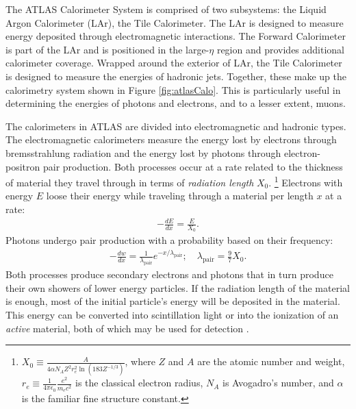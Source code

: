 The ATLAS Calorimeter System is comprised of two subsystems: the Liquid Argon Calorimeter (LAr), the Tile Calorimeter.
The LAr is designed to measure energy deposited through electromagnetic interactions.
The Forward Calorimeter is part of the LAr and is positioned in the large-$\eta$ region and provides additional calorimeter coverage.
Wrapped around the exterior of LAr, the Tile Calorimeter is designed to measure the energies of hadronic jets.
Together, these make up the calorimetry system shown in Figure \ref{fig:atlasCalo}.
This is particularly useful in determining the energies of photons and electrons, and to a lesser extent, muons.

The calorimeters in ATLAS are divided into electromagnetic and hadronic types.
The electromagnetic calorimeters measure the energy lost by electrons through bremsstrahlung radiation and the energy lost by photons through electron-positron pair production.
Both processes occur at a rate related to the thickness of material they travel through in terms of \emph{radiation length} $X_0$.
\footnote{$X_0\equiv\frac{A}{4\alpha N_AZ^2r_e^2\ln(183Z^{-1/3})}$, where $Z$ and $A$ are the atomic number and weight, $r_e\equiv\frac{1}{4\pi\epsilon_0}\frac{e^2}{m_ec^2}$ is the classical electron radius, $N_A$ is Avogadro's number, and $\alpha$ is the familiar fine structure constant.}
Electrons with energy $E$ loose their energy while traveling through a material per length $x$ at a rate:
\begin{equation}\begin{split}
    -\frac{dE}{dx}=\frac{E}{X_0}.
\end{split}\end{equation}
Photons undergo pair production with a probability based on their frequency:
\begin{equation}\begin{split}
    -\frac{dw}{dx}=\frac{1}{\lambda_\text{pair}}e^{-x/\lambda_\text{pair}}; \quad \lambda_\text{pair}=\frac{9}{7}X_0.
\end{split}\end{equation}
Both processes produce secondary electrons and photons that in turn produce their own showers of lower energy particles.
If the radiation length of the material is enough, most of the initial particle's energy will be deposited in the material.
This energy can be converted into scintillation light or into the ionization of an \emph{active} material, both of which may be used for detection  \cite{grupen}.

